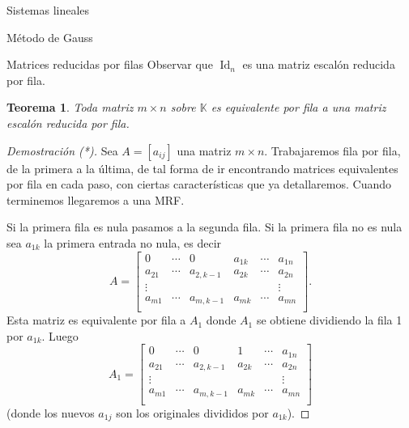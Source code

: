 \documentclass[a4paper,12pt,twoside,spanish,reqno]{amsbook}
\numberwithin{equation}{section}
\newtheorem{teorema}{Teorema}[section]
\theoremstyle{definition}
\theoremstyle{remark}
\newcommand{\Id}{\operatorname{Id}}
\newcommand{\K}{\mathbb K}
\begin{document}
\begin{chapter}{Sistemas lineales}
\begin{section}{Método de Gauss }
\begin{subsection}{Matrices reducidas por filas}
                Observar que $\Id_n$ es una matriz escalón reducida por fila.
                
                \begin{teorema}\label{th-merf}
                    Toda matriz $m \times n$ sobre $\K$ es equivalente por fila a una matriz escalón reducida por fila.
                \end{teorema}
                \begin{proof}[Demostración (*)]
                    Sea $A = [a_{ij}]$ una matriz $m \times n$. Trabajaremos fila por fila, de la primera a la última, de tal forma de ir encontrando matrices equivalentes por fila en cada paso, con ciertas características que ya detallaremos. Cuando terminemos llegaremos a una MRF.  
                    
                    Si la primera fila es nula pasamos a la segunda fila. Si la primera fila no es nula sea $a_{1k}$ la primera entrada no nula, es decir
                    \begin{equation*}
                    A = \begin{bmatrix}
                    0 & \cdots & 0 & a_{1k} & \cdots & a_{1n} \\
                    a_{21}& \cdots & a_{2,k-1} & a_{2k} & \cdots & a_{2n} \\
                    \vdots&  &  &  &  & \vdots \\
                    a_{m1}& \cdots & a_{m,k-1} & a_{mk} & \cdots & a_{mn} \\
                    \end{bmatrix}.
                    \end{equation*} 
                    Esta matriz es equivalente por fila a $A_1$ donde $A_1$ se obtiene dividiendo la fila 1 por $a_{1k}$. Luego 
                    \begin{equation*}
                    A_1 = \begin{bmatrix}
                    0 & \cdots & 0 & 1 & \cdots & a_{1n} \\
                    a_{21}& \cdots & a_{2,k-1} & a_{2k} & \cdots & a_{2n} \\
                    \vdots&  &  &  &  & \vdots \\
                    a_{m1}& \cdots & a_{m,k-1} & a_{mk} & \cdots & a_{mn} \\
                    \end{bmatrix}
                    \end{equation*}
                    (donde los nuevos $a_{1j}$ son  los originales divididos por $a_{1k}$).  
                    

\end{proof}
\end{subsection}
\end{section}
\end{chapter}
\end{document}
